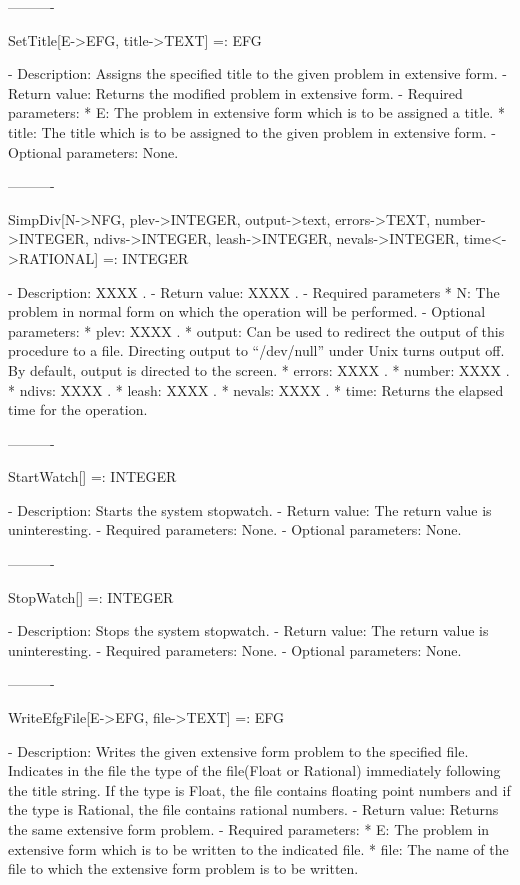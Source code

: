 ----------

SetTitle[E->EFG, title->TEXT] =: EFG

   -	Description:  Assigns the specified title to the given problem in 
	extensive form.
   -	Return value:  Returns the modified problem in extensive form.
   -	Required parameters:
	  *  E:  The problem in extensive form which is to be assigned a title.
	  *  title:  The title which is to be assigned to the given problem in 
		extensive form.
  -	Optional parameters:  None.

----------

SimpDiv[N->NFG, {plev->INTEGER}, {output->text}, {errors->TEXT},
	{number->INTEGER}, {ndivs->INTEGER}, {leash->INTEGER}, 
	{nevals->INTEGER}, {time<->RATIONAL}] =: INTEGER

   -	Description:  XXXX .
   -	Return value:  XXXX .
   -	Required parameters
	  *  N:  The problem in normal form on which the operation will be 
		performed.
   -	Optional parameters:
	  *  plev: XXXX .
	  *  output:  Can be used to redirect the output of this procedure to a
		file.  Directing output to ``/dev/null'' under Unix turns 
		output off.  By default, output is directed to the screen.
	  *  errors:  XXXX .
	  *  number:  XXXX .
	  *  ndivs:  XXXX .
	  *  leash:  XXXX .
	  *  nevals:  XXXX .
	  *  time:  Returns the elapsed time for the operation.

----------

StartWatch[] =: INTEGER

   -	Description:  Starts the system stopwatch.  
   -	Return value:  The return value is uninteresting.
   -	Required parameters:  None.
   -	Optional parameters:  None.

----------

StopWatch[] =: INTEGER

   -	Description:  Stops the system stopwatch.  
   -	Return value:  The return value is uninteresting.
   -	Required parameters:  None.
   -	Optional parameters:  None.

----------

WriteEfgFile[E->EFG, file->TEXT] =: EFG

   -	Description:  Writes the given extensive form problem to the specified 
	file.  Indicates in the file the type of the file(Float or Rational) 
	immediately following the title string.  If the type is Float, the file
	contains floating point numbers and if the type is Rational, the file
	contains rational numbers.  
   -	Return value:  Returns the same extensive form problem.
   -	Required parameters:
	  *  E:  The problem in extensive form which is to be written to the
		indicated file.
	  *  file:  The name of the file to which the extensive form problem is
		to be written.

